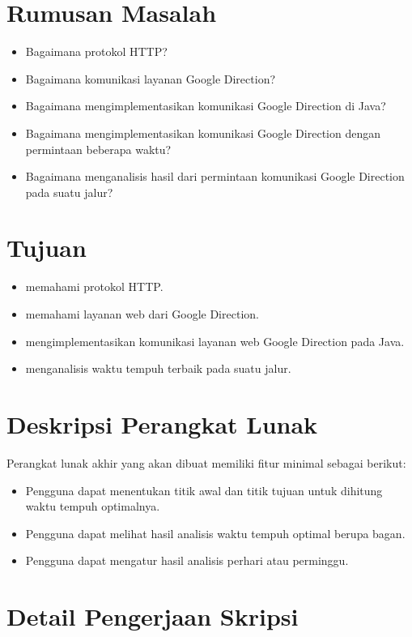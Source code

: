 \documentclass[a4paper,twoside]{article}
\begin{document}
\section{Rumusan Masalah}

\begin{itemize}
	\item Bagaimana protokol HTTP?
	\item Bagaimana komunikasi layanan Google Direction?
	\item Bagaimana mengimplementasikan komunikasi Google Direction di Java?
	\item Bagaimana mengimplementasikan komunikasi Google Direction dengan permintaan beberapa waktu?
	\item Bagaimana menganalisis hasil dari permintaan komunikasi Google Direction pada suatu jalur?
\end{itemize}

\section{Tujuan}

\begin{itemize}
	\item memahami protokol HTTP.
	\item memahami layanan web dari Google Direction.
	\item mengimplementasikan komunikasi layanan web Google Direction pada Java.
	\item menganalisis waktu tempuh terbaik pada suatu jalur.
\end{itemize}

\section{Deskripsi Perangkat Lunak}

Perangkat lunak akhir yang akan dibuat memiliki fitur minimal sebagai berikut:
\begin{itemize}
	\item Pengguna dapat menentukan titik awal dan titik tujuan untuk dihitung waktu tempuh optimalnya.
	\item Pengguna dapat melihat hasil analisis waktu tempuh optimal berupa bagan.
	\item Pengguna dapat mengatur hasil analisis perhari atau perminggu.
\end{itemize}

\section{Detail Pengerjaan Skripsi}
\end{document}
